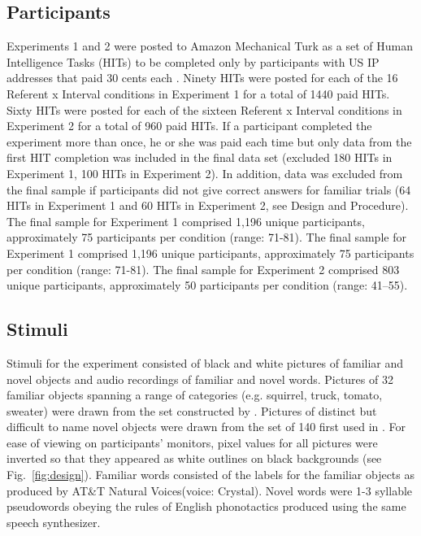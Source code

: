 \documentclass{pnastwo}
\begin{document}
\begin{article}
\begin{materials}
\subsection{Participants}
Experiments 1 and 2 were posted to Amazon Mechanical Turk as a set of Human Intelligence Tasks (HITs) to be completed only by participants with US IP addresses that paid 30 cents each \citep[for a detailed comparison of laboratory and Mechanical Turk studies see][]{Crump2013}. Ninety HITs were posted for each of the 16 Referent x Interval conditions in Experiment 1 for a total of 1440 paid HITs. Sixty HITs were posted for each of the sixteen Referent x Interval conditions in Experiment 2 for a total of 960 paid HITs. If a participant completed the experiment more than once, he or she was paid each time but only data from the first HIT completion was included in the final data set (excluded 180 HITs in Experiment 1, 100 HITs in Experiment 2). In addition, data was excluded from the final sample if participants did not give correct answers for familiar trials (64 HITs in Experiment 1 and 60 HITs in Experiment 2, see Design and Procedure). The final sample for Experiment 1 comprised 1,196 unique participants, approximately 75 participants per condition (range: 71-81). The final sample for Experiment 1 comprised 1,196 unique participants, approximately 75 participants per condition (range: 71-81). The final sample for Experiment 2 comprised 803 unique participants, approximately 50 participants per condition (range: 41--55).

\subsection{Stimuli}
Stimuli for the experiment consisted of black and white pictures of familiar and novel objects and audio recordings of familiar and novel words. Pictures of 32 familiar objects spanning a range of categories (e.g. squirrel, truck, tomato, sweater) were drawn from the set constructed by \citep{Snodgrass1980}. Pictures of distinct but difficult to name novel objects were drawn from the set of 140 first used in \citep{Kanwisher1997}. For ease of viewing on participants' monitors, pixel values for all pictures were inverted so that they appeared as white outlines on black backgrounds (see Fig.~\ref{fig:design}). Familiar words consisted of the labels for the familiar objects as produced by AT\&T Natural Voices\texttrademark (voice: Crystal). Novel words were 1-3 syllable pseudowords obeying the rules of English phonotactics produced using the same speech synthesizer. 


\end{materials}
\end{article}
\end{document}
